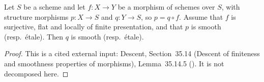 \begin{lemma}
\label{lem:pc-smooth-descends-flat}
Let $S$ be a scheme and let $f:X\to Y$ be a morphism of schemes over $S$, with structure
morphisms $p:X\to S$ and $q:Y\to S$, so $p=q\circ f$.  Assume that $f$ is surjective, flat
and locally of finite presentation, and that $p$ is smooth (resp.\ \'etale).  Then $q$ is
smooth (resp.\ \'etale).
\end{lemma}
\begin{proof}
This is a cited external input: Descent, Section~35.14 (Descent of finiteness and smoothness
properties of morphisms), Lemma~35.14.5 ().  It is not decomposed here.
\end{proof}

